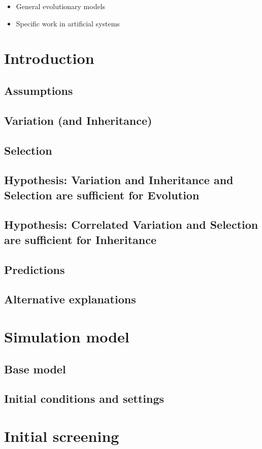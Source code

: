 \documentclass[]{report}
\begin{document}
\begin{itemize}
	\item General evolutionary models
	\item Specific work in artificial systems
\end{itemize}

\chapter{Introduction}
\section{Assumptions}
\section{Variation (and Inheritance)}
\section{Selection}
\section{Hypothesis: Variation and Inheritance and Selection are sufficient for Evolution}
\section{Hypothesis: Correlated Variation and Selection are sufficient for Inheritance}
\section{Predictions}
\section{Alternative explanations}

\chapter{Simulation model}
\section{Base model}
\section{Initial conditions and settings}

\chapter{Initial screening}
\end{document}
